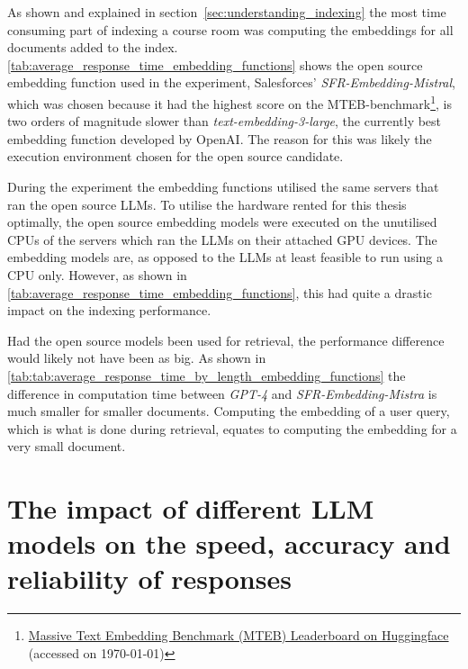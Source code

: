 As shown and explained in section~\ref{sec:understanding_indexing} the most time consuming part of indexing a course room was computing the embeddings for all documents added to the index. \autoref{tab:average_response_time_embedding_functions} shows the open source embedding function used in the experiment, Salesforces’ \textit{SFR-Embedding-Mistral}\cite{meng_sfr-embedding-mistral_2024}, which was chosen because it had the highest score on the \gls{MTEB}-benchmark\footnote{\href{https://huggingface.co/spaces/mteb/leaderboard}{Massive Text Embedding Benchmark (MTEB) Leaderboard on Huggingface} (accessed on \today)}, is two orders of magnitude slower than \textit{text-embedding-3-large}, the currently best embedding function developed by OpenAI. The reason for this was likely the execution environment chosen for the open source candidate.





During the experiment the embedding functions utilised the same servers that ran the open source \gls{LLM}s. To utilise the hardware rented for this thesis optimally, the open source embedding models were executed on the unutilised CPUs of the servers which ran the \gls{LLM}s on their attached GPU devices. The embedding models are, as opposed to the \gls{LLM}s at least feasible to run using a CPU only. However, as shown in \autoref{tab:average_response_time_embedding_functions}, this had quite a drastic impact on the indexing performance.


Had the open source models been used for retrieval, the performance difference would likely not have been as big. As shown in \autoref{tab:tab:average_response_time_by_length_embedding_functions} the difference in computation time between \textit{GPT-4} and \textit{SFR-Embedding-Mistra} is much smaller for smaller documents. Computing the embedding of a user query, which is what is done during retrieval, equates to computing the embedding for a very small document.







\section{The impact of different LLM models on the speed, accuracy and reliability of responses}
\label{sec:impact_of_llm_on_user_preferences}


